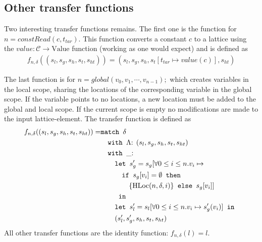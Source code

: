 \subsection{Other transfer functions}
\label{sec:otherTransferFuncs}
Two interesting transfer functions remains. The first one is the function for $n = \mathit{constRead}(c, t_{tar})$. This function converts a constant $c$ to a lattice using the $value : \mathcal{C} \rightarrow \text{Value}$ function (working as one would expect) and is defined as
\begin{align}
f_{n,\delta}((s_l, s_g, s_h, s_t,s_{ht})) = (s_l, s_g, s_h, s_t[t_{tar} \mapsto value(c)], s_{ht})
\end{align}

The last function is for $n = global(v_0, v_1, \cdots, v_{n-1});$ which creates variables in the local scope, sharing the locations of the corresponding variable in the global scope. If the variable points to no locations, a new location must be added to the global and local scope. If the current scope is empty no modifications are made to the input lattice-element. The transfer function is defined as
\begin{align}
f_{n, \delta} ((s_l,s_g,s_h,s_t, s_{ht})) =     &\texttt{match }\delta\notag\\
                                                &\quad\texttt{with }\Lambda\text{: }(s_l,s_g,s_h,s_t, s_{ht})\notag\\
                                                &\quad\texttt{with }\_\text{: }\notag\\
                                                &\quad\quad\texttt{let } s_g' = s_g[\forall 0\leq i \leq n. v_i\mapsto \notag\\                                                
                                                &\quad\quad\quad\texttt{if }s_g[v_i] = \emptyset\texttt{ then } \notag\\
                                                &\quad\quad\quad\quad\{\text{HLoc}(n, \delta, i)\} \texttt{ else } s_g[v_i]]\notag\\
                                                &\quad\quad \texttt{ in } \notag\\
                                                &\quad\quad\texttt{let } s_l'=s_l[\forall 0\leq i \leq n. v_i\mapsto s_g'(v_i)] \texttt{ in }\notag\\
                                                &\quad\quad(s_l',s_g',s_h,s_t, s_{ht})
\end{align}
All other transfer functions are the identity function: $f_{n,\delta}(l) = l$.

